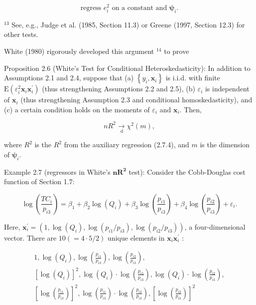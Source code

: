 \documentclass[10pt]{article}
\begin{document}
\begin{equation*}
\text { regress } e_{i}^{2} \text { on a constant and } \boldsymbol{\psi}_{i} \text {. } \tag{2.7.4}
\end{equation*}


${ }^{13}$ See, e.g., Judge et al. (1985, Section 11.3) or Greene (1997, Section 12.3) for other tests.

White (1980) rigorously developed this argument ${ }^{14}$ to prove

Proposition 2.6 (White's Test for Conditional Heteroskedasticity): In addition to Assumptions 2.1 and 2.4, suppose that (a) $\left\{y_{i}, \mathbf{x}_{i}\right\}$ is i.i.d. with finite $\mathrm{E}\left(\varepsilon_{i}^{2} \mathbf{x}_{i} \mathbf{x}_{i}^{\prime}\right)$ (thus strengthening Assumptions 2.2 and 2.5), (b) $\varepsilon_{i}$ is independent of $\mathbf{x}_{i}$ (thus strengthening Assumption 2.3 and conditional homoskedasticity), and (c) a certain condition holds on the moments of $\varepsilon_{i}$ and $\mathbf{x}_{i}$. Then,

$$
n R^{2} \underset{\mathrm{~d}}{\rightarrow} \chi^{2}(m),
$$

where $R^{2}$ is the $R^{2}$ from the auxiliary regression (2.7.4), and $m$ is the dimension of $\boldsymbol{\psi}_{i}$.

Example 2.7 (regressors in White's $\boldsymbol{n} \boldsymbol{R}^{\mathbf{2}}$ test): Consider the Cobb-Douglas cost function of Section 1.7:

$$
\log \left(\frac{T C_{i}}{p_{i 3}}\right)=\beta_{1}+\beta_{2} \log \left(Q_{i}\right)+\beta_{3} \log \left(\frac{p_{i 1}}{p_{i 3}}\right)+\beta_{4} \log \left(\frac{p_{i 2}}{p_{i 3}}\right)+\varepsilon_{i} .
$$

Here, $\mathbf{x}_{i}^{\prime}=\left(1, \log \left(Q_{i}\right), \log \left(p_{i 1} / p_{i 3}\right), \log \left(p_{i 2} / p_{i 3}\right)\right)$, a four-dimensional vector. There are $10(=4 \cdot 5 / 2)$ unique elements in $\mathbf{x}_{i} \mathbf{x}_{i}^{\prime}$ :

$$
\begin{gathered}
1, \log \left(Q_{i}\right), \log \left(\frac{p_{i 1}}{p_{i 3}}\right), \log \left(\frac{p_{i 2}}{p_{i 3}}\right), \\
{\left[\log \left(Q_{i}\right)\right]^{2}, \log \left(Q_{i}\right) \cdot \log \left(\frac{p_{i 1}}{p_{i 3}}\right), \log \left(Q_{i}\right) \cdot \log \left(\frac{p_{i 2}}{p_{i 3}}\right),} \\
{\left[\log \left(\frac{p_{i 1}}{p_{i 3}}\right)\right]^{2}, \log \left(\frac{p_{i 1}}{p_{i 3}}\right) \cdot \log \left(\frac{p_{i 2}}{p_{i 3}}\right),\left[\log \left(\frac{p_{i 2}}{p_{i 3}}\right)\right]^{2}}
\end{gathered}
$$
\end{document}
